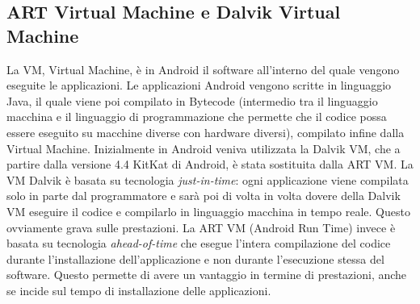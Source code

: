\subsection{ART Virtual Machine e Dalvik Virtual Machine}
La VM, Virtual Machine, è in Android il software all’interno del 
quale vengono eseguite le applicazioni. Le applicazioni Android vengono scritte in
linguaggio Java, il quale viene poi compilato in Bytecode
(intermedio tra il linguaggio macchina e il linguaggio di
programmazione che permette che il codice possa essere eseguito su macchine
diverse con hardware diversi), compilato infine
dalla Virtual Machine. Inizialmente in Android veniva utilizzata la Dalvik VM,
che a partire dalla versione 4.4 KitKat di Android, è stata sostituita dalla ART
VM.
La VM Dalvik è basata su tecnologia \textit{just-in-time}: ogni applicazione viene
compilata solo in parte dal programmatore e sarà poi di volta in volta dovere
della Dalvik VM eseguire il codice e compilarlo in linguaggio macchina in tempo
reale. Questo ovviamente grava sulle prestazioni.
La ART VM (Android Run Time) invece è basata su tecnologia \textit{ahead-of-time} che esegue l'intera
compilazione del codice durante l'installazione dell'applicazione e non durante
l'esecuzione stessa del software. Questo permette di avere un vantaggio in
termine di prestazioni, anche se incide sul tempo di installazione delle
applicazioni.

